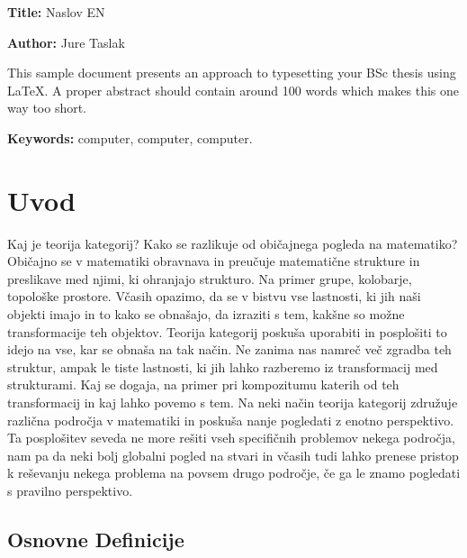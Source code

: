 \documentclass[12pt,a4paper]{book}
\newcommand{\ttitleEn}{Naslov EN}
\newcommand{\tauthor}{Jure Taslak}
\newcommand{\tkeywordsEn}{computer, computer, computer}
\newcommand{\clearemptydoublepage}{\newpage{\pagestyle{empty}\cleardoublepage}}
\theoremstyle{definition}
\theoremstyle{plain}
\theoremstyle{definition}
\theoremstyle{remark}
\begin{document}
\noindent\textbf{Title:} \ttitleEn
\bigskip

\noindent\textbf{Author:} \tauthor
\bigskip

\noindent This sample document presents an approach to typesetting your BSc thesis using \LaTeX. 
A proper abstract should contain around 100 words which makes this one way too short.
\bigskip

\noindent\textbf{Keywords:} \tkeywordsEn.
\clearemptydoublepage

\mainmatter
\setcounter{page}{1}
\pagestyle{fancy}

\chapter{Uvod}
Kaj je teorija kategorij? Kako se razlikuje od običajnega pogleda na matematiko? Običajno se v matematiki obravnava in preučuje matematične strukture in preslikave med njimi, ki ohranjajo strukturo. Na primer grupe, kolobarje, topološke prostore. Včasih opazimo, da se v bistvu vse lastnosti, ki jih naši objekti imajo in to kako se obnašajo, da izraziti s tem, kakšne so možne transformacije teh objektov. Teorija kategorij poskuša uporabiti in posplošiti to idejo na vse, kar se obnaša na tak način. Ne zanima nas namreč več zgradba teh struktur, ampak le tiste lastnosti, ki jih lahko razberemo iz transformacij med strukturami. Kaj se dogaja, na primer pri kompozitumu katerih od teh transformacij in kaj lahko povemo s tem. Na neki način teorija kategorij združuje različna področja v matematiki in poskuša nanje pogledati z enotno perspektivo. Ta posplošitev seveda ne more rešiti vseh specifičnih problemov nekega področja, nam pa da neki bolj globalni pogled na stvari in včasih tudi lahko prenese pristop k reševanju nekega problema na povsem drugo področje, če ga le znamo pogledati s pravilno perspektivo.

\section{Osnovne Definicije}
\end{document}
